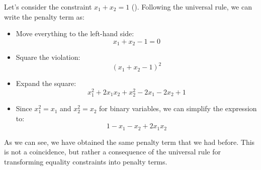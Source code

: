 \highspace
\begin{examplebox}
    Let's consider the constraint $x_1 + x_2 = 1$ (). Following the universal rule, we can write the penalty term as:
    \begin{itemize}
        \item Move everything to the left-hand side:
        \begin{equation*}
            x_1 + x_2 - 1 = 0
        \end{equation*}
        \item Square the violation:
        \begin{equation*}
            (x_1 + x_2 - 1)^2
        \end{equation*}
        \item Expand the square:
        \begin{equation*}
            x_1^2 + 2x_1x_2 + x_2^2 - 2x_1 - 2x_2 + 1
        \end{equation*}
        \item Since $x_1^2 = x_1$ and $x_2^2 = x_2$ for binary variables, we can simplify the expression to:
        \begin{equation*}
            1 - x_1 - x_2 + 2x_1x_2
        \end{equation*}
    \end{itemize}
    As we can see, we have obtained the same penalty term that we had before. This is not a coincidence, but rather a consequence of the universal rule for transforming equality constraints into penalty terms.
\end{examplebox}